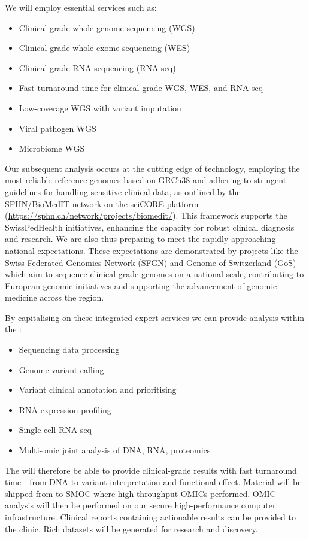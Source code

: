 We will employ essential services such as:
\begin{itemize}
    \item Clinical-grade whole genome sequencing (WGS)
    \item Clinical-grade whole exome sequencing (WES)
    \item Clinical-grade RNA sequencing (RNA-seq)
    \item Fast turnaround time for clinical-grade WGS, WES, and RNA-seq
    \item Low-coverage WGS with variant imputation
    \item Viral pathogen WGS
    \item Microbiome WGS
\end{itemize}

Our subsequent analysis  occurs at the cutting edge of technology, employing the most reliable reference genomes based on GRCh38 and adhering to stringent guidelines for handling sensitive clinical data, as outlined by the SPHN/BioMedIT network on the sciCORE platform (\url{https://sphn.ch/network/projects/biomedit/}). This framework supports the SwissPedHealth initiatives, enhancing the capacity for robust clinical diagnosis and research. 
We are also thus preparing to meet the rapidly approaching national expectations.
These expectations are demonstrated by projects like the Swiss Federated Genomics Network (SFGN) and Genome of Switzerland (GoS) which aim to sequence clinical-grade genomes on a national scale, contributing to European genomic initiatives and supporting the advancement of genomic medicine across the region.

By capitalising on these integrated expert services we can provide analysis within the \pmu:
\begin{itemize}
\item Sequencing data processing
\item Genome variant calling
\item Variant clinical annotation and prioritising
\item RNA expression profiling
\item Single cell RNA-seq
\item Multi-omic joint analysis of DNA, RNA, proteomics
\end{itemize}

The \pmu will therefore be able to provide clinical-grade results with fast turnaround time - 
from DNA to variant interpretation and functional effect.
Material will be shipped from \kispi to SMOC where high-throughput OMICs performed.
OMIC analysis will then be performed on our secure  high-performance computer infrastructure.
Clinical reports containing actionable results can be provided to the clinic.
Rich datasets will be generated for research and discovery.
